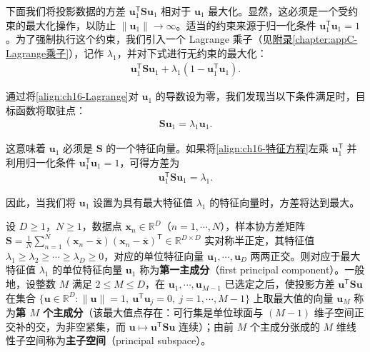 \documentclass[../../main.tex]{subfiles}
\begin{document}
下面我们将投影数据的方差 $\bm{u}_1^{\mathsf T}\bm{S}\bm{u}_1$ 相对于 $\bm{u}_1$ 最大化。显然，这必须是一个受约束的最大化操作，以防止 $\|\bm{u}_1\|\rightarrow\infty$。适当的约束来源于归一化条件 $\bm{u}_1^{\mathsf T}\bm{u}_1=1$。为了强制执行这个约束，我们引入一个 Lagrange 乘子（见\hyperref[chapter:appC-Lagrange乘子]{附录\ref*{chapter:appC-Lagrange乘子}}），记作 $\lambda_1$，并对下式进行无约束的最大化：
\begin{align}
  \bm{u}_1^{\mathsf T}\bm{S}\bm{u}_1+\lambda_1(1-\bm{u}_1^{\mathsf T}\bm{u}_1).
  \label{align:ch16-Lagrange}
\end{align}

通过将\eqref{align:ch16-Lagrange}对 $\bm{u}_1$ 的导数设为零，我们发现当以下条件满足时，目标函数将取驻点：
\begin{align}
  \bm{S}\bm{u}_1=\lambda_1\bm{u}_1.
  \label{align:ch16-特征方程}
\end{align}

这意味着 $\bm{u}_1$ 必须是 $\bm{S}$ 的一个特征向量。如果将\eqref{align:ch16-特征方程}左乘 $\bm{u}_1^{\mathsf T}$ 并利用归一化条件 $\bm{u}_1^{\mathsf T}\bm{u}_1=1$，可得方差为
\begin{align}
  \bm{u}_1^{\mathsf T}\bm{S}\bm{u}_1=\lambda_1.
  \label{align:ch16-特征值方差}
\end{align}

因此，当我们将 $\bm{u}_1$ 设置为具有最大特征值 $\lambda_1$ 的特征向量时，方差将达到最大。

\begin{definition}[主成分与主子空间]\label{definition:ch16-主成分}
设 $D\geqslant1$，$N\geqslant1$，数据点 $\bm{x}_n\in\mathbb{R}^{D}$（$n=1,\cdots,N$），样本协方差矩阵 $\bm{S}=\frac{1}{N}\sum_{n=1}^{N}(\bm{x}_n-\bar{\bm{x}})(\bm{x}_n-\bar{\bm{x}})^{\mathsf T}\in\mathbb{R}^{D\times D}$ 实对称半正定，其特征值 $\lambda_1\geqslant\lambda_2\geqslant\cdots\geqslant\lambda_D\geqslant0$，对应的单位特征向量 $\bm{u}_1,\cdots,\bm{u}_D$ 两两正交。则对应于最大特征值 $\lambda_1$ 的单位特征向量 $\bm{u}_1$ 称为\textbf{第一主成分}（first principal component）。一般地，设整数 $M$ 满足 $2\leqslant M\leqslant D$，在 $\bm{u}_1,\cdots,\bm{u}_{M-1}$ 已选定之后，使投影方差 $\bm{u}^{\mathsf T}\bm{S}\bm{u}$ 在集合 $\{\bm{u}\in\mathbb{R}^{D}:\|\bm{u}\|=1,\ \bm{u}^{\mathsf T}\bm{u}_j=0,\ j=1,\cdots,M-1\}$ 上取最大值的向量 $\bm{u}_M$ 称为\textbf{第 $M$ 个主成分}（该最大值点存在：可行集是单位球面与 $(M-1)$ 维子空间正交补的交，为非空紧集，而 $\bm{u}\mapsto\bm{u}^{\mathsf T}\bm{S}\bm{u}$ 连续）；由前 $M$ 个主成分张成的 $M$ 维线性子空间称为\textbf{主子空间}（principal subspace）。
\end{definition}
\end{document}
